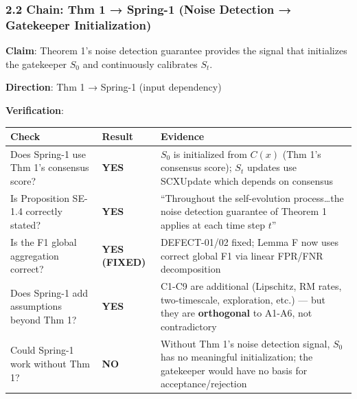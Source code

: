 \documentclass[
  12pt,
]{ctexart}
\begin{document}
\subsubsection{2.2 Chain: Thm 1 → Spring-1 (Noise Detection → Gatekeeper
Initialization)}\label{chain-thm-1-spring-1-noise-detection-gatekeeper-initialization}

\textbf{Claim}: Theorem 1's noise detection guarantee provides the
signal that initializes the gatekeeper \(S_0\) and continuously
calibrates \(S_t\).

\textbf{Direction}: Thm 1 → Spring-1 (input dependency)

\textbf{Verification}:

\begin{longtable}[]{@{}
  >{\raggedright\arraybackslash}p{}
  >{\raggedright\arraybackslash}p{}
  >{\raggedright\arraybackslash}p{}@{}}
\toprule\noalign{}
\begin{minipage}[b]{\linewidth}\raggedright
Check
\end{minipage} & \begin{minipage}[b]{\linewidth}\raggedright
Result
\end{minipage} & \begin{minipage}[b]{\linewidth}\raggedright
Evidence
\end{minipage} \\
\midrule\noalign{}
\endhead
\bottomrule\noalign{}
\endlastfoot
Does Spring-1 use Thm 1's consensus score? & \textbf{YES} & \(S_0\) is
initialized from \(C(x)\) (Thm 1's consensus score); \(S_t\) updates use
SCXUpdate which depends on consensus \\
Is Proposition SE-1.4 correctly stated? & \textbf{YES} & ``Throughout
the self-evolution process\ldots the noise detection guarantee of
Theorem 1 applies at each time step \(t\)'' \\
Is the F1 global aggregation correct? & \textbf{YES (FIXED)} &
DEFECT-01/02 fixed; Lemma F now uses correct global F1 via linear
FPR/FNR decomposition \\
Does Spring-1 add assumptions beyond Thm 1? & \textbf{YES} & C1-C9 are
additional (Lipschitz, RM rates, two-timescale, exploration, etc.) ---
but they are \textbf{orthogonal} to A1-A6, not contradictory \\
Could Spring-1 work without Thm 1? & \textbf{NO} & Without Thm 1's noise
detection signal, \(S_0\) has no meaningful initialization; the
gatekeeper would have no basis for acceptance/rejection \\
\end{longtable}
\end{document}

